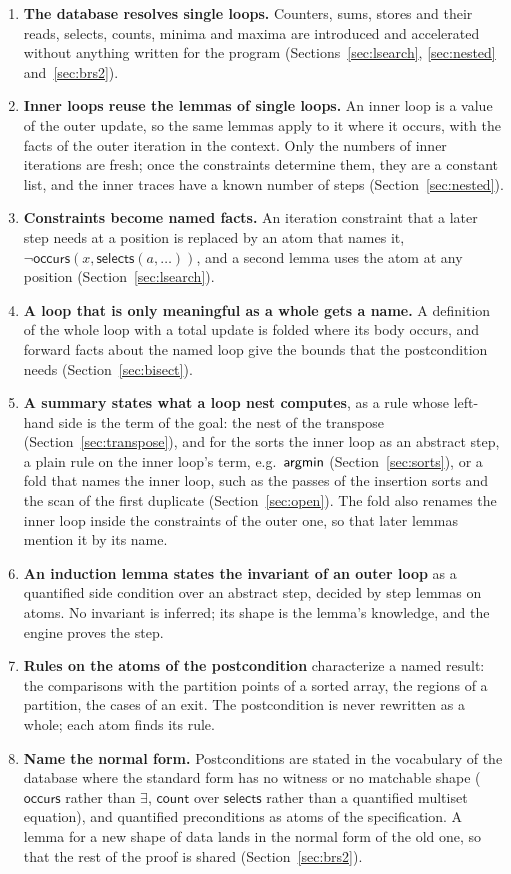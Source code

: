 \begin{enumerate}[nosep]
\item \textbf{The database resolves single loops.} Counters, sums, stores and their reads, selects, counts, minima
  and maxima are introduced and accelerated without anything written for the program (Sections~\ref{sec:lsearch},
  \ref{sec:nested} and~\ref{sec:brs2}).
\item \textbf{Inner loops reuse the lemmas of single loops.} An inner loop is a value of the outer update, so the same
  lemmas apply to it where it occurs, with the facts of the outer iteration in the context. Only the numbers of inner
  iterations are fresh; once the constraints determine them, they are a constant list, and the inner traces have a
  known number of steps (Section~\ref{sec:nested}).
\item \textbf{Constraints become named facts.} An iteration constraint that a later step needs at a position is
  replaced by an atom that names it, $\neg\mathsf{occurs}(x, \mathsf{selects}(a, \ldots))$, and a second lemma uses the atom
  at any position (Section~\ref{sec:lsearch}).
\item \textbf{A loop that is only meaningful as a whole gets a name.} A definition of the whole loop with a total
  update is folded where its body occurs, and forward facts about the named loop give the bounds that the
  postcondition needs (Section~\ref{sec:bisect}).
\item \textbf{A summary states what a loop nest computes}, as a rule whose left-hand side is the term of the goal: the
  nest of the transpose (Section~\ref{sec:transpose}), and for the sorts the inner loop as an abstract step, a plain rule
  on the inner loop's term, e.g.\ $\mathsf{argmin}$ (Section~\ref{sec:sorts}), or a fold that names the inner loop, such as the
  passes of the insertion sorts and the scan of the first duplicate (Section~\ref{sec:open}). The fold also renames
  the inner loop inside the constraints of the outer one, so that later lemmas mention it by its name.
\item \textbf{An induction lemma states the invariant of an outer loop} as a quantified side condition over an
  abstract step, decided by step lemmas on atoms. No invariant is inferred; its shape is the lemma's knowledge, and
  the engine proves the step.
\item \textbf{Rules on the atoms of the postcondition} characterize a named result: the comparisons with the partition
  points of a sorted array, the regions of a partition, the cases of an exit. The postcondition is never rewritten as
  a whole; each atom finds its rule.
\item \textbf{Name the normal form.} Postconditions are stated in the vocabulary of the database where the
  standard form has no witness or no matchable shape ($\mathsf{occurs}$ rather than $\exists$, $\mathsf{count}$ over
  $\mathsf{selects}$ rather than a quantified multiset equation), and quantified preconditions as atoms of the
  specification. A lemma for a new shape of data lands in the normal form of the old one, so that the rest of the
  proof is shared (Section~\ref{sec:brs2}).
\end{enumerate}
